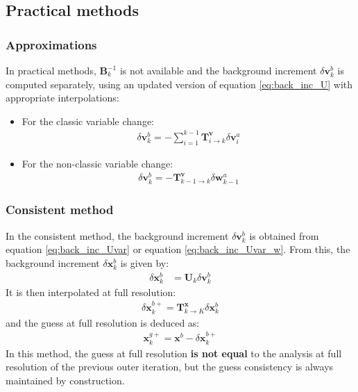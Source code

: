 \documentclass[12pt]{scrartcl}
\begin{document}
\subsection{Practical methods}

\subsubsection{Approximations}
In practical methods, $\mathbf{B}_k^{-1}$ is not available and the background increment $\delta \mathbf{v}^b_k$ is computed separately, using an updated version of equation \eqref{eq:back_inc_U} with appropriate interpolations:
\begin{itemize}
\item For the classic variable change:
\begin{align}
\label{eq:back_inc_Uvar}
\boxed{\delta \mathbf{v}^b_k = - \sum_{i=1}^{k-1} \mathbf{T}^\mathbf{v}_{i \rightarrow k} \delta \mathbf{v}^a_i}
\end{align}
\item For the non-classic variable change:
\begin{align}
\label{eq:back_inc_Uvar_w}
\boxed{\delta \mathbf{v}^b_k = - \mathbf{T}^\mathbf{v}_{k-1 \rightarrow k} \delta \mathbf{w}^a_{k-1}}
\end{align}
\end{itemize}

\subsubsection{Consistent method}
In the consistent method, the background increment $\delta \mathbf{v}^b_k$ is obtained from equation \eqref{eq:back_inc_Uvar} or equation \eqref{eq:back_inc_Uvar_w}. From this, the background increment $\delta \mathbf{x}^b_k$ is given by:
\begin{align}
\label{eq:consistent_U}
\delta \mathbf{x}^b_k & = \mathbf{U}_k \delta \mathbf{v}^b_k
\end{align}
It is then interpolated at full resolution:
\begin{align}
\label{eq:full_res_consistent_U}
\delta \mathbf{x}^{b+}_k = \mathbf{T}^\mathbf{x}_{k \rightarrow K} \delta \mathbf{x}^b_k
\end{align}
and the guess at full resolution is deduced as:
\begin{align}
\label{eq:full_res_consistent_guess}
\mathbf{x}^{g+}_k = \mathbf{x}^b - \delta \mathbf{x}^{b+}_k
\end{align}
In this method, the guess at full resolution \textbf{is not equal} to the analysis at full resolution of the previous outer iteration, but the guess consistency is always maintained by construction.
\end{document}
